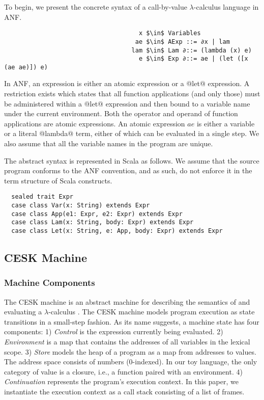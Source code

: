 \documentclass[acmsmall, screen]{acmart}\settopmatter{}
\begin{document}
To begin, we present the concrete syntax of a call-by-value $\lambda$-calculus language
in ANF.

\begin{lstlisting}
                                     x $\in$ Variables
                                    ae $\in$ AExp ::= ∂x | lam
                                   lam $\in$ Lam ∂::= (lambda (x) e)
                                     e $\in$ Exp ∂::= ae | (let ([x (ae ae)]) e)
\end{lstlisting}

In ANF, an expression is either an atomic expression or a @let@ expression.
A restriction exists which states that all function applications (and only those) must be administered
within a @let@ expression and then bound to a variable name under the current environment.
Both the operator and operand of function applications are atomic expressions.
An atomic expression $ae$ is either a variable or a literal @lambda@ term, either of which
can be evaluated in a single step. We also assume that all the variable names in the program
 are unique.

The abstract syntax is represented in Scala as follows. We assume that the source program conforms
to the ANF convention, and as such, do not enforce it in the term structure of Scala constructs.

\begin{lstlisting}
  sealed trait Expr
  case class Var(x: String) extends Expr
  case class App(e1: Expr, e2: Expr) extends Expr
  case class Lam(x: String, body: Expr) extends Expr
  case class Let(x: String, e: App, body: Expr) extends Expr
\end{lstlisting}

\subsection{CESK Machine} \label{cesk}

\subsubsection{Machine Components}

The CESK machine is an abstract machine for describing the semantics of and evaluating
a $\lambda$-calculus \cite{felleisen1987calculus}. The CESK machine models program execution
as state transitions in a small-step fashion. As its name suggests, a machine state has
four components:
1) \textit{Control} is the expression currently being evaluated.
2) \textit{Environment} is a map that contains the addresses of all variables in the lexical scope.
3) \textit{Store} models the heap of a program as a map from addresses to values.
  The address space consists of numbers (0-indexed).
  In our toy language, the only category of value is a closure, i.e., a function paired with
  an environment.
4) \textit{Continuation} represents the program's execution context. In this paper, we instantiate the
execution context as a call stack consisting of a list of frames.
\end{document}
